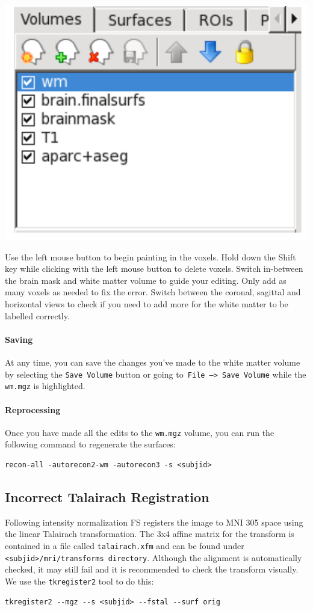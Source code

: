 \documentclass[paper=a4, fontsize=11pt]{scrartcl} %
\numberwithin{equation}{section} %
\numberwithin{figure}{section} %
\numberwithin{table}{section} %
\begin{document}
 \includegraphics[scale=0.4]{wm-man.png}
 
Use the left mouse button to begin painting in the voxels. Hold down the Shift key while clicking with the left mouse button to delete voxels.  Switch in-between the brain mask and white matter volume to guide your editing.  Only add as many voxels as needed to fix the error. Switch between the coronal, sagittal and horizontal views to check if you need to add more for the white matter to be labelled correctly.
\paragraph{Saving} At any time, you can save the changes you've made to the white matter volume by selecting the \texttt{Save Volume} button or going to\texttt{ File --> Save Volume} while the \texttt{wm.mgz} is highlighted. 
\paragraph{Reprocessing} Once you have made all the edits to the \texttt{wm.mgz} volume, you can run the following command to regenerate the surfaces:
~\\
\begin{lstlisting}[frame=single]
recon-all -autorecon2-wm -autorecon3 -s <subjid>
\end{lstlisting}
\subsection{Incorrect Talairach Registration}\label{ss:tal} Following intensity normalization FS registers the image to MNI 305 space using the linear Talairach transformation.  The 3x4 affine matrix for the transform is contained in a file called \texttt{talairach.xfm} and can be found under \texttt{<subjid>/mri/transforms directory}.  Although the alignment is automatically checked, it may still fail and it is recommended to check the transform visually.  We use the \texttt{tkregister2} tool to do this:
~\\
\begin{lstlisting}[frame=single]
tkregister2 --mgz --s <subjid> --fstal --surf orig
\end{lstlisting}
\end{document}
